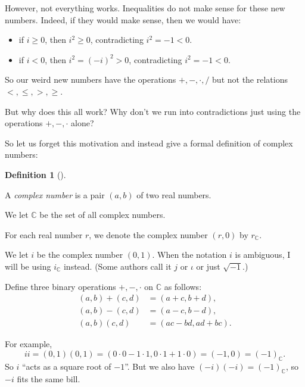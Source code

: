 \documentclass[numbers=enddot,12pt,final,onecolumn,notitlepage]{scrartcl}%
\numberwithin{exer}{subsection}
\theoremstyle{definition}
\newtheorem{defi}[theo]{Definition}
\newenvironment{definition}[1][]
{\begin{defi}[#1]\begin{leftbar}}
{\end{leftbar}\end{defi}}
\begin{document}
However, not everything works. Inequalities do not make sense for these new
numbers. Indeed, if they would make sense, then we would have:

\begin{itemize}
\item if $i\geq0$, then $i^{2}\geq0$, contradicting $i^{2}=-1<0$.

\item if $i<0$, then $i^{2}=\left(  -i\right)  ^{2}>0$, contradicting
$i^{2}=-1<0$.
\end{itemize}

So our weird new numbers have the operations $+,-,\cdot,/$ but not the
relations $<,\leq,>,\geq$.

But why does this all work? Why don't we run into contradictions just using
the operations $+,-,\cdot$ alone?

So let us forget this motivation and instead give a formal definition of
complex numbers:

\begin{definition}
A \textit{complex number} is a pair $\left(  a,b\right)  $ of two real numbers.

We let $\mathbb{C}$ be the set of all complex numbers.

For each real number $r$, we denote the complex number $\left(  r,0\right)  $
by $r_{\mathbb{C}}$.

We let $i$ be the complex number $\left(  0,1\right)  $. When the notation $i$
is ambiguous, I will be using $i_{\mathbb{C}}$ instead. (Some authors call it
$j$ or $\iota$ or just $\sqrt{-1}$.)

Define three binary operations $+,-,\cdot$ on $\mathbb{C}$ as follows:%
\begin{align*}
\left(  a,b\right)  +\left(  c,d\right)   &  =\left(  a+c,b+d\right)  ,\\
\left(  a,b\right)  -\left(  c,d\right)   &  =\left(  a-c,b-d\right)  ,\\
\left(  a,b\right)  \left(  c,d\right)   &  =\left(  ac-bd,ad+bc\right)  .
\end{align*}

\end{definition}

For example,%
\[
ii=\left(  0,1\right)  \left(  0,1\right)  =\left(  0\cdot0-1\cdot
1,0\cdot1+1\cdot0\right)  =\left(  -1,0\right)  =\left(  -1\right)
_{\mathbb{C}}.
\]
So $i$ \textquotedblleft acts as a square root of $-1$\textquotedblright. But
we also have $\left(  -i\right)  \left(  -i\right)  =\left(  -1\right)
_{\mathbb{C}}$, so $-i$ fits the same bill.
\end{document}
